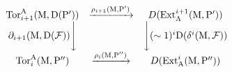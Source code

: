 \[
\begin{array}{c c c} \operatorname{Tor} _ {i + 1} ^ {\mathrm{A}} (\mathrm{M}, \mathrm{D} (\mathrm{P} ^ {\prime})) & \xrightarrow {\rho_ {i + 1} (\mathrm{M} , \mathrm{P} ^ {\prime})} & D (\operatorname{Ext} _ {\Lambda} ^ {i + 1} (\mathrm{M}, \mathrm{P} ^ {\prime})) \\ \partial_ {i + 1} (\mathrm{M}, \mathrm{D} (\mathcal {F})) \Bigg \downarrow & & \Bigg \downarrow (\sim 1) ^ {i} \mathrm{D} (\delta^ {i} (\mathrm{M}, \mathcal {F})) \\ \operatorname{Tor} _ {i} ^ {\mathrm{A}} (\mathrm{M}, \mathrm{P} ^ {\prime \prime}) & \xrightarrow {\rho_ {i} (\mathrm{M} , \mathrm{P} ^ {\prime \prime})} & D (\operatorname{Ext} _ {\mathrm{A}} ^ {i} (\mathrm{M}, \mathrm{P} ^ {\prime \prime})) \end{array}
\]

